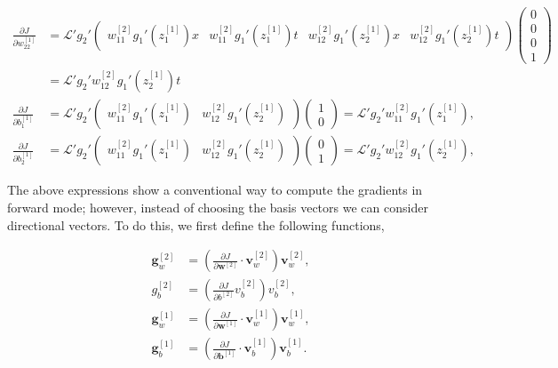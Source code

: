 \documentclass{article}
\begin{document}
\begin{align}
\frac{\partial J}{\partial w_{22}^{[1]}} &= 
\mathcal{L}'
g_2'
\begin{pmatrix}
w_{11}^{[2]}  g_1'(z_1^{[1]}) x & w_{11}^{[2]} g_1'(z_1^{[1]}) t & w_{12}^{[2]} g_1'(z_2^{[1]}) x &  w_{12}^{[2]} g_1'(z_2^{[1]}) t
\end{pmatrix}
\begin{pmatrix}
0 \\
0 \\
0 \\
1
\end{pmatrix} \nonumber \\
&= 
\mathcal{L}'
g_2'
w_{12}^{[2]} g_1'(z_2^{[1]}) t \\
\frac{\partial J}{\partial b_1^{[1]}} &= 
\mathcal{L}'
g_2' 
\begin{pmatrix}
w_{11}^{[2]} g_1'(z_1^{[1]}) & w_{12}^{[2]} g_1'(z_2^{[1]}) 
\end{pmatrix}
\begin{pmatrix}
1 \\
0
\end{pmatrix} = 
\mathcal{L}'
g_2'
w_{11}^{[2]} g_1'(z_1^{[1]}),\\
\frac{\partial J}{\partial b_2^{[1]}} &= 
\mathcal{L}'
g_2' 
\begin{pmatrix}
w_{11}^{[2]} g_1'(z_1^{[1]}) & w_{12}^{[2]} g_1'(z_2^{[1]}) 
\end{pmatrix}
\begin{pmatrix}
0 \\
1
\end{pmatrix} = 
\mathcal{L}'
g_2'
w_{12}^{[2]} g_1'(z_2^{[1]}),
\label{dJdb1mat_fw2}
\end{align}

The above expressions show a conventional way to compute the gradients in forward mode; however, instead of choosing the basis vectors we can consider directional vectors. To do this, we first define the following functions,

\begin{align}
\label{gw2}
\textbf{g}_w^{[2]} &= \left( \frac{\partial J}{\partial \textbf{w}^{[2]}} \cdot \textbf{v}_w^{[2]}\right)\textbf{v}_w^{[2]}, \\
g_b^{[2]} &= \left( \frac{\partial J}{\partial b^{[2]}} v_b^{[2]} \right)v_b^{[2]}, \\
\textbf{g}_w^{[1]} &= \left( \frac{\partial J}{\partial \textbf{w}^{[1]}} \cdot \textbf{v}_w^{[1]}\right)\textbf{v}_w^{[1]}, \\
\textbf{g}_b^{[1]} &= \left( \frac{\partial J}{\partial \textbf{b}^{[1]}} \cdot \textbf{v}_b^{[1]}\right)\textbf{v}_b^{[1]}.
\label{gb1} 
\end{align}
\end{document}
